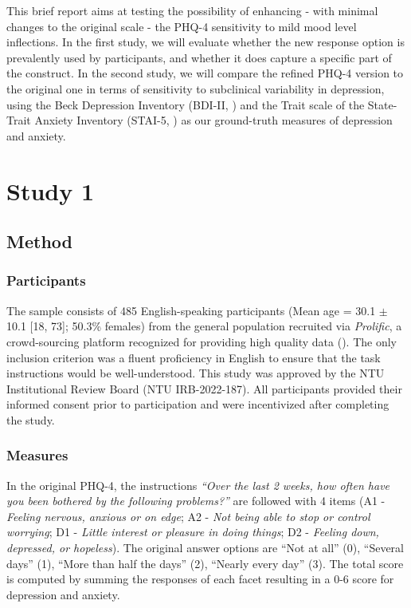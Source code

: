 \documentclass[
  jou,
  longtable,
  nolmodern,
  notxfonts,
  notimes,
  mask,
  colorlinks=true,linkcolor=blue,citecolor=blue,urlcolor=blue]{apa7}
\begin{document}
This brief report aims at testing the possibility of enhancing - with
minimal changes to the original scale - the PHQ-4 sensitivity to mild
mood level inflections. In the first study, we will evaluate whether the
new response option is prevalently used by participants, and whether it
does capture a specific part of the construct. In the second study, we
will compare the refined PHQ-4 version to the original one in terms of
sensitivity to subclinical variability in depression, using the Beck
Depression Inventory (BDI-II, ) and the Trait scale of the State-Trait Anxiety Inventory (STAI-5,
) as our
ground-truth measures of depression and anxiety.

\section{Study 1}\label{study-1}

\subsection{Method}\label{method}

\subsubsection{Participants}\label{participants}

The sample consists of 485 English-speaking participants (Mean age =
30.1 \(\pm\) 10.1 {[}18, 73{]}; 50.3\% females) from the general
population recruited via \emph{Prolific}, a crowd-sourcing platform
recognized for providing high quality data
(). The only inclusion
criterion was a fluent proficiency in English to ensure that the task
instructions would be well-understood. This study was approved by the
NTU Institutional Review Board (NTU IRB-2022-187). All participants
provided their informed consent prior to participation and were
incentivized after completing the study.

\subsubsection{Measures}\label{measures}

In the original PHQ-4, the instructions \emph{``Over the last 2 weeks,
how often have you been bothered by the following problems?''} are
followed with 4 items (A1 - \emph{Feeling nervous, anxious or on edge};
A2 - \emph{Not being able to stop or control worrying}; D1 -
\emph{Little interest or pleasure in doing things}; D2 - \emph{Feeling
down, depressed, or hopeless}). The original answer options are ``Not at
all'' (0), ``Several days'' (1), ``More than half the days'' (2),
``Nearly every day'' (3). The total score is computed by summing the
responses of each facet resulting in a 0-6 score for depression and
anxiety.
\end{document}
